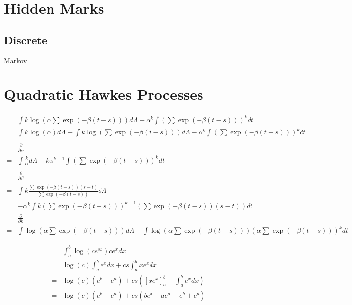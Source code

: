 \documentclass[honours,12pt]{unswthesis}
\numberwithin{equation}{section}
\begin{document}
\section{Hidden Marks}
\subsection{Discrete}
Markov

\section{Quadratic Hawkes Processes}
\begin{equation*}
	\begin{align}
		& \int k\log(\alpha \sum \exp(-\beta(t-s))) d\Lambda - \alpha^k \int \left(\sum\exp(-\beta(t-s))\right)^k dt \\
		= & \int k \log(\alpha) d\Lambda + \int k\log(\sum \exp(-\beta(t-s))) d\Lambda - \alpha^k \int \left(\sum\exp(-\beta(t-s))\right)^k dt \\
		\\
		& \frac{\partial}{\partial \alpha} \\
		= & \int \frac{k}{\alpha}d\Lambda - k\alpha^{k-1} \int \left(\sum \exp(-\beta (t-s))\right)^k dt \\
		\\
		& \frac{\partial}{\partial \beta} \\
		= & \int k \frac{\sum \exp(-\beta(t-s))(s-t)}{\sum \exp(-\beta(t-s))} d\Lambda \\ & - \alpha^k \int k \left(\sum \exp(-\beta (t-s))\right)^{k-1} \left(\sum \exp(-\beta(t-s))(s-t)\right) dt
		\\
		& \frac{\partial}{\partial k} \\
		= & \int \log(\alpha \sum \exp(-\beta(t-s))) d\Lambda - \int \log\left(\alpha\sum\exp(-\beta(t-s))\right) \left(\alpha\sum\exp(-\beta(t-s))\right)^k dt
	\end{align}
\end{equation*}

\begin{equation*}
	\begin{align}
		& \int_a^b \log(c e^{sx}) c e^x dx \\
		= & \log(c) \int_a^b e^x dx + cs\int_a^b x e^x dx \\
		= & \log(c)(e^b-e^a) + cs \left(\left[x e^x\right]_a^b - \int_a^b e^x dx\right) \\
		= & \log(c)(e^b-e^a) + cs \left(be^b - a e^a - e^b + e^a\right)
	\end{align}
\end{equation*}
\end{document}
